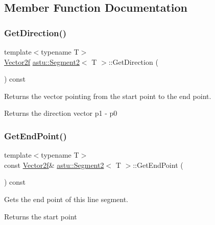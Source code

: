 \subsection{Member Function Documentation}
\mbox{\label{classastu_1_1Segment2_a68bde513c070c248ddf69b1ebca1e7fc}} 
\subsubsection{\texorpdfstring{Get\+Direction()}{GetDirection()}}
{\footnotesize\ttfamily template$<$typename T$>$ \\
\hyperlink{classastu_1_1Vector2}{Vector2f} \hyperlink{classastu_1_1Segment2}{astu\+::\+Segment2}$<$ T $>$\+::Get\+Direction (\begin{DoxyParamCaption}{ }\end{DoxyParamCaption}) const\hspace{0.3cm}{\ttfamily [inline]}}

Returns the vector pointing from the start point to the end point.

\begin{DoxyReturn}{Returns}
the direction vector p1 -\/ p0 
\end{DoxyReturn}
\mbox{\label{classastu_1_1Segment2_aa54a8ea0be86e591d593e5412ed6bc05}} 
\subsubsection{\texorpdfstring{Get\+End\+Point()}{GetEndPoint()}}
{\footnotesize\ttfamily template$<$typename T$>$ \\
const \hyperlink{classastu_1_1Vector2}{Vector2f}\& \hyperlink{classastu_1_1Segment2}{astu\+::\+Segment2}$<$ T $>$\+::Get\+End\+Point (\begin{DoxyParamCaption}{ }\end{DoxyParamCaption}) const\hspace{0.3cm}{\ttfamily [inline]}}

Gets the end point of this line segment.

\begin{DoxyReturn}{Returns}
the start point 
\end{DoxyReturn}
\mbox{\label{classastu_1_1Segment2_ae970169b80e29939c7f0b84b5b614435}} 
